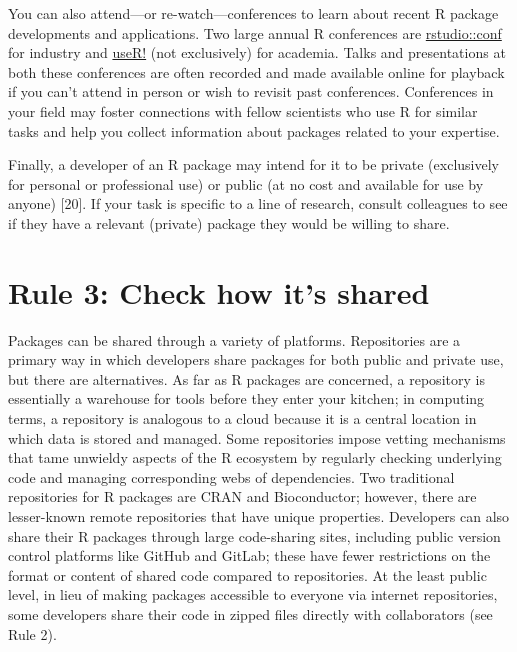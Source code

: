 \documentclass[10pt,letterpaper]{article}
\begin{document}
You can also attend---or re-watch---conferences to learn about recent R
package developments and applications. Two large annual R conferences
are \href{https://rstudio.com/conference/}{rstudio::conf} for industry
and \href{https://www.r-consortium.org/}{useR!} (not exclusively) for
academia. Talks and presentations at both these conferences are often
recorded and made available online for playback if you can't attend in
person or wish to revisit past conferences. Conferences in your field
may foster connections with fellow scientists who use R for similar
tasks and help you collect information about packages related to your
expertise.

Finally, a developer of an R package may intend for it to be private
(exclusively for personal or professional use) or public (at no cost and
available for use by anyone) {[}20{]}. If your task is specific to a
line of research, consult colleagues to see if they have a relevant
(private) package they would be willing to share.

\hypertarget{rule-3-check-how-its-shared}{%
\section{Rule 3: Check how it's
shared}\label{rule-3-check-how-its-shared}}

Packages can be shared through a variety of platforms. Repositories are
a primary way in which developers share packages for both public and
private use, but there are alternatives. As far as R packages are
concerned, a repository is essentially a warehouse for tools before they
enter your kitchen; in computing terms, a repository is analogous to a
cloud because it is a central location in which data is stored and
managed. Some repositories impose vetting mechanisms that tame unwieldy
aspects of the R ecosystem by regularly checking underlying code and
managing corresponding webs of dependencies. Two traditional
repositories for R packages are CRAN and Bioconductor; however, there
are lesser-known remote repositories that have unique properties.
Developers can also share their R packages through large code-sharing
sites, including public version control platforms like GitHub and
GitLab; these have fewer restrictions on the format or content of shared
code compared to repositories. At the least public level, in lieu of
making packages accessible to everyone via internet repositories, some
developers share their code in zipped files directly with collaborators
(see Rule 2).
\end{document}
